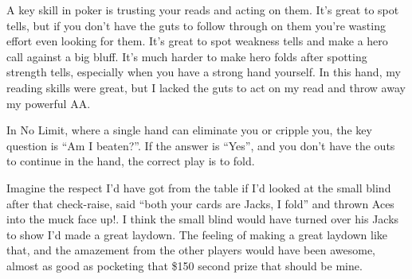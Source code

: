 A key skill in poker is trusting your reads and acting on them.
It's great to spot tells, but if you don't have the guts to follow
through on them you're wasting effort even looking for them. It's
great to spot weakness tells and make a hero call against a big bluff.
It's much harder to make hero folds after spotting strength tells,
especially when you have a strong hand yourself.
In this hand, my reading skills were great, but I lacked the guts to act
on my read and throw away my powerful AA.

In No Limit, where a single hand can eliminate you or cripple you, the key
question is ``Am I beaten?''. If the answer is ``Yes'', and you don't have
the outs to continue in the hand, the correct play is to fold.

Imagine the respect I'd have got from the table if I'd looked at the
small blind after that check-raise, said ``both your cards are
Jacks, I fold'' and thrown Aces into the muck face up!. I think the
small blind would have turned over his Jacks to show I'd made a great
laydown. The feeling of making a great laydown like that,
and the amazement from the other players would have been awesome, almost as
good as pocketing that \$150 second prize that should be mine.


